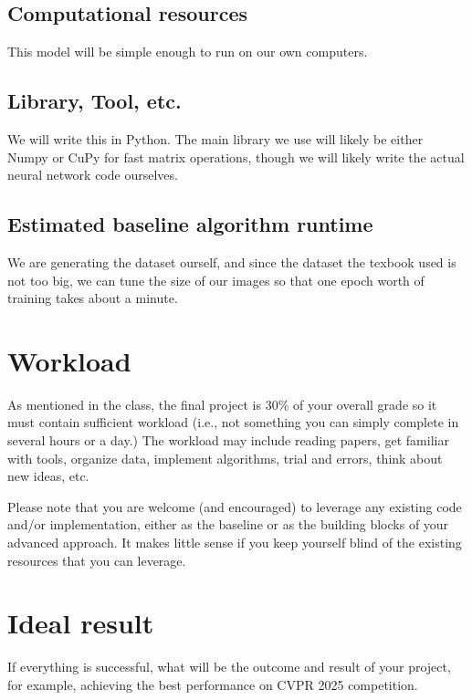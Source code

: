 \documentclass{article}
\begin{document}
\subsection{Computational resources}

This model will be simple enough to run on our own computers.

\subsection{Library, Tool, etc.}
We will write this in Python.  The main library we use will likely be either Numpy or CuPy for fast matrix operations, though we will likely write the actual neural network code ourselves.

\subsection{Estimated baseline algorithm runtime}

We are generating the dataset ourself, and since the dataset the texbook used is not too big, we can tune the size of our images so that one epoch worth of training takes about a minute.

\section{Workload}
{\color{red}
As mentioned in the class, the final project is 30\% of your overall grade so it must contain sufficient workload (i.e., not something you can simply complete in several hours or a day.) The workload may include reading papers, get familiar with tools, organize data, implement algorithms, trial and errors, think about new ideas, etc.

Please note that you are welcome (and encouraged) to leverage any existing code and/or implementation, either as the baseline or as the building blocks of your advanced approach. It makes little sense if you keep yourself blind of the existing resources that you can leverage. 
}


\section{Ideal result}
{\color{red}
If everything is successful, what will be the outcome and result of your project, for example, achieving the best performance on CVPR 2025 competition.
}
\end{document}
